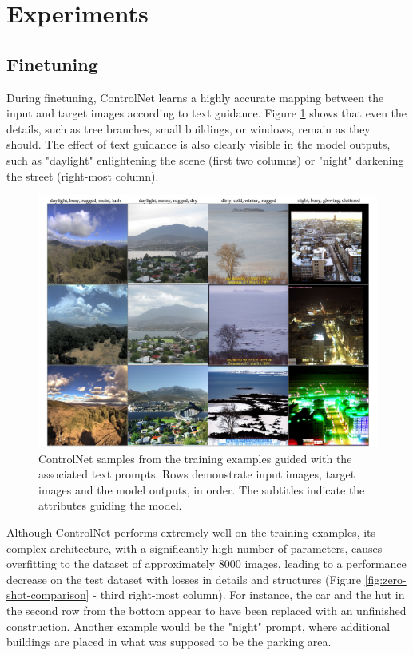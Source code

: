 \section{Experiments}\label{zero-shot-exp}

\subsection{Finetuning}
During finetuning, ControlNet learns a highly accurate mapping between the input and target images according to text guidance. Figure  \ref{fig:controlnet-train} shows that even the details, such as tree branches, small buildings, or windows, remain as they should. The effect of text guidance is also clearly visible in the model outputs, such as "daylight" enlightening the scene (first two columns) or "night" darkening the street (right-most column).
 
\begin{figure}[ht]
  \includegraphics[width=\textwidth]{Chapters/zero-shot-tat-figs/Controlnet2.png}
  \caption{ControlNet samples from the training examples guided with the associated text prompts. Rows demonstrate input images, target images and the model outputs, in order. The subtitles indicate the attributes guiding the model.}
  \label{fig:controlnet-train}
\end{figure}

Although ControlNet performs extremely well on the training examples, its complex architecture, with a significantly high number of parameters, causes overfitting to the dataset of approximately 8000 images, leading to a performance decrease on the test dataset with losses in details and structures (Figure \ref{fig:zero-shot-comparison} - third right-most column). For instance, the car and the hut in the second row from the bottom appear to have been replaced with an unfinished construction. Another example would be the "night" prompt, where additional buildings are placed in what was supposed to be the parking area.

